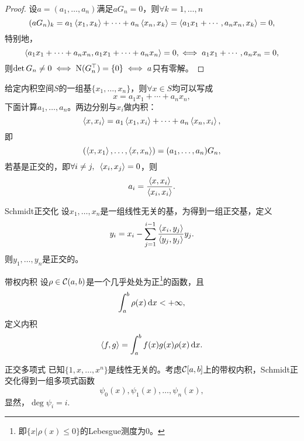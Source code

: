 \begin{proof}
    设$a=(a_1,\ldots,a_n)$满足$aG_n=0$，则$\forall k=1,\ldots,n$
    \[
        (aG_n)_k=a_1\left\langle x_1,x_k\right\rangle+\cdots+a_n\left\langle x_n,x_k\right\rangle=\left\langle a_1x_1+\cdots,a_nx_n,x_k\right\rangle=0,
    \]
    特别地，
    \[
        \left\langle a_1x_1+\cdots+a_nx_n,a_1x_1+\cdots+a_nx_n\right\rangle=0,\iff a_1x_1+\cdots,a_nx_n=0,
    \]
    则$\det G_n\neq 0\iff \mathrm N(G_n^\top)=\{0\}\iff a$只有零解。
\end{proof}

\begin{example}
    {}{}
    给定内积空间$S$的一组基$\{x_1,\ldots,x_n\}$，则$\forall x\in S$均可以写成
    \[
        x=a_1x_1+\cdots+a_nx_n,
    \]
    下面计算$a_1,\ldots,a_n$。两边分别与$x_i$做内积：
    \[
        \left\langle x,x_i\right\rangle=a_1\left\langle x_1,x_i\right\rangle+\cdots+a_n\left\langle x_n,x_i\right\rangle,
    \]
    即
    \[
        (\left\langle x,x_1\right\rangle,\ldots,\left\langle x,x_n\right\rangle)=(a_1,\ldots,a_n)G_n,
    \]
    若基是正交的，即$\forall i\neq j,\enspace\left\langle x_i,x_j\right\rangle=0$，则 
    \[
        a_i=\frac{\left\langle x,x_i\right\rangle}{\left\langle x_i,x_i\right\rangle}.
    \]
\end{example}

\begin{theorem}
    {Schmidt正交化}{}
    设$x_1,\ldots,x_n$是一组线性无关的基，为得到一组正交基，定义
    \begin{equation}
        y_i=x_i-\sum_{j=1}^{i-1}\frac{\left\langle x_i,y_j\right\rangle}{\left\langle y_j,y_j\right\rangle}y_j.
    \end{equation}
    则$y_1,\ldots,y_n$是正交的。
\end{theorem}

\begin{definition}
    {带权内积}{}
    设$\rho\in\mathcal C(a,b)$是一个几乎处处为正\footnote{即$\{x|\rho(x)\leq 0\}$的Lebesgue测度为0。}的函数，且
    \[
        \int_a^b\rho(x)\mathop{}\!\mathrm{d} x<+\infty,
    \]
    定义内积
    \begin{equation}
        \left\langle f,g\right\rangle=\int_a^bf(x)g(x)\rho(x)\mathop{}\!\mathrm{d} x.
    \end{equation}
\end{definition}

\begin{definition}
    {正交多项式}{}
    已知$\{1,x,\ldots,x^n\}$是线性无关的。考虑$\mathcal C[a,b]$上的带权内积，Schmidt正交化得到一组多项式函数
    \[
        \psi_0(x),\psi_1(x),\ldots,\psi_n(x),
    \]
    显然，$\deg\psi_i=i.$
\end{definition}

